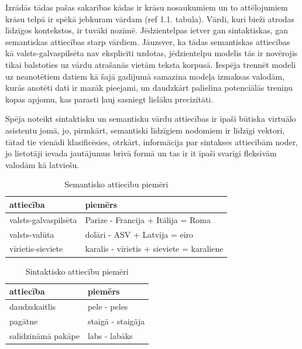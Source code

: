

Izrādās tādas pašas sakarības kādas ir krāsu nosaukumiem un to attēlojumiem krāsu telpā ir spēkā jebkuram vārdam (ref 1.1. tabula). Vārdi, kuri bieži atrodas līdzīgos kontekstos, ir tuvāki nozīmē. Jēdzientelpas ietver gan sintaktiskas, gan semantiskas attiecības starp vārdiem. Jāuzsver, ka tādas semantiskas attiecības kā valsts-galvaspilsēta nav eksplicīti uzdotas, jēdzientelpu modelis tās ir novērojis tikai balstoties uz vārdu atrašanās vietām teksta korpusā. Iespēja trennēt modeli uz neanotētiem datiem kā šajā gadījumā samazina modeļa izmaksas valodām, kurās anotēti dati ir mazāk pieejami, un daudzkārt palielina potenciālās treniņu kopas apjomu, kas parasti ļauj sasniegt lielāku precizitāti.


Spēja noteikt sintaktisku un semantisku vārdu attiecības ir īpaši būtiska virtuālo asistentu jomā, jo, pirmkārt, semantiski līdzīgiem nodomiem ir līdzīgi vektori, tātad tie vienādi klasificēsies, otrkārt, informācija par sintakses attiecībām noder, jo lietotāji ievada jautājumus brīvā formā un tas ir it īpaši svarīgi fleksīvām valodām kā latviešu.



\begin{table}[htbp]
	\centering
	\caption{Semantisko attiecību piemēri}
	\begin{tabular}{ll}\toprule
		attiecība & piemērs  \\\midrule
		valsts-galvaspilsēta   & Parīze - Francija + Itālija = Roma \\
		valsts-valūta   & dolāri - ASV + Latvija = eiro \\
		vīrietis-sieviete   & karalis - vīrietis + sieviete = karaliene \\\bottomrule
	\end{tabular}%
	\label{tab:semantic-relationship-examples}%
\end{table}

\begin{table}[htbp]
	\centering
	\caption{Sintaktisko attiecību piemēri}
	\begin{tabular}{ll}\toprule
		attiecība & piemērs  \\\midrule
		daudzskaitlis   & pele - peles \\
		pagātne   & staigā - staigāja \\
		salīdzināmā pakāpe   & labs - labāks \\\bottomrule
	\end{tabular}%
	\label{tab:semantic-relationship-examples}%
\end{table}


